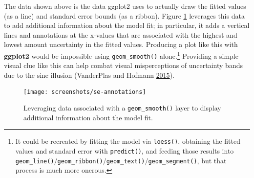 \documentclass[12pt,]{isuthesis}
\newenvironment{Shaded}{\begin{snugshade}}{\end{snugshade}}
\newcommand{\KeywordTok}[1]{\textcolor[rgb]{0.13,0.29,0.53}{\textbf{{#1}}}}
\newcommand{\DataTypeTok}[1]{\textcolor[rgb]{0.13,0.29,0.53}{{#1}}}
\newcommand{\DecValTok}[1]{\textcolor[rgb]{0.00,0.00,0.81}{{#1}}}
\newcommand{\StringTok}[1]{\textcolor[rgb]{0.31,0.60,0.02}{{#1}}}
\newcommand{\NormalTok}[1]{{#1}}
\let\rmarkdownfootnote\footnote%
\def\footnote{\protect\rmarkdownfootnote}
\begin{document}
The data shown above is the data ggplot2 uses to actually draw the
fitted values (as a line) and standard error bounds (as a ribbon).
Figure \ref{fig:se-annotations} leverages this data to add additional
information about the model fit; in particular, it adds a vertical lines
and annotations at the x-values that are associated with the highest and
lowest amount uncertainty in the fitted values. Producing a plot like
this with \textbf{ggplot2} would be impossible using
\texttt{geom\_smooth()} alone.\footnote{It could be recreated by fitting
  the model via \texttt{loess()}, obtaining the fitted values and
  standard error with \texttt{predict()}, and feeding those results into
  \texttt{geom\_line()}/\texttt{geom\_ribbon()}/\texttt{geom\_text()}/\texttt{geom\_segment()},
  but that process is much more onerous.} Providing a simple visual clue
like this can help combat visual misperceptions of uncertainty bands due
to the sine illusion (VanderPlas and Hofmann
\protect\hyperlink{ref-sine-illusion}{2015}).

\begin{Shaded}
\end{Shaded}

\begin{figure}
\centering
\texttt{[image: screenshots/se-annotations]}
\caption{\label{fig:se-annotations}Leveraging data associated with a
\texttt{geom\_smooth()} layer to display additional information about
the model fit.}
\end{figure}
\end{document}
